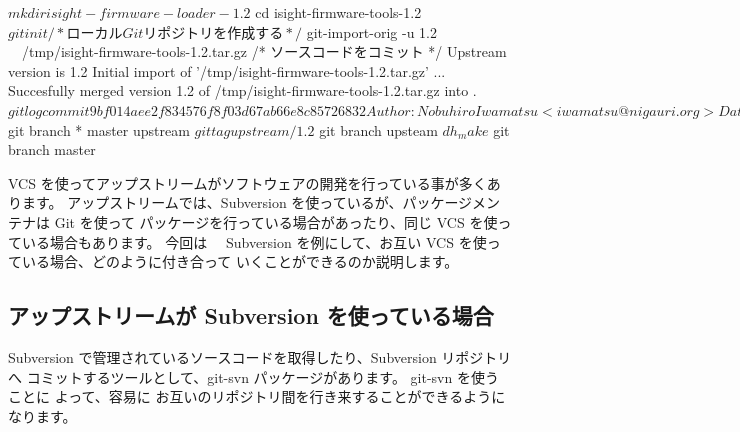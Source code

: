 \documentclass[mingoth,a4paper]{jsarticle}
\begin{document}
\begin{commandline}
$ mkdir isight-firmware-loader-1.2
$ cd isight-firmware-tools-1.2
$ git init /* ローカル Git リポジトリを作成する */
$ git-import-orig -u 1.2 　/tmp/isight-firmware-tools-1.2.tar.gz /* ソースコードをコミット */
Upstream version is 1.2
Initial import of '/tmp/isight-firmware-tools-1.2.tar.gz' ...
Succesfully merged version 1.2 of /tmp/isight-firmware-tools-1.2.tar.gz into .
$ git log
commit 9bf014aee2f834576f8f03d67ab66e8c85726832
Author: Nobuhiro Iwamatsu <iwamatsu@nigauri.org>
Date:   Tue Apr 8 21:42:55 2008 +0900

    Imported Upstream version 1.2
$ git branch
* master
  upstream
$ git tag
upstream/1.2
$ git branch upsteam
$ dh_make
$ git branch master
\end{commandline}



\label{sec:upstreamvcs}

VCS を使ってアップストリームがソフトウェアの開発を行っている事が多くあります。
アップストリームでは、Subversion を使っているが、パッケージメンテナは Git を使って
パッケージを行っている場合があったり、同じ VCS を使っている場合もあります。
今回は 　Subversion を例にして、お互い VCS を使っている場合、どのように付き合って
いくことができるのか説明します。


\subsection{アップストリームが Subversion を使っている場合 }
Subversion で管理されているソースコードを取得したり、Subversion リポジトリへ
コミットするツールとして、git-svn パッケージがあります。 git-svn を使うことに
よって、容易に お互いのリポジトリ間を行き来することができるようになります。
\end{document}
